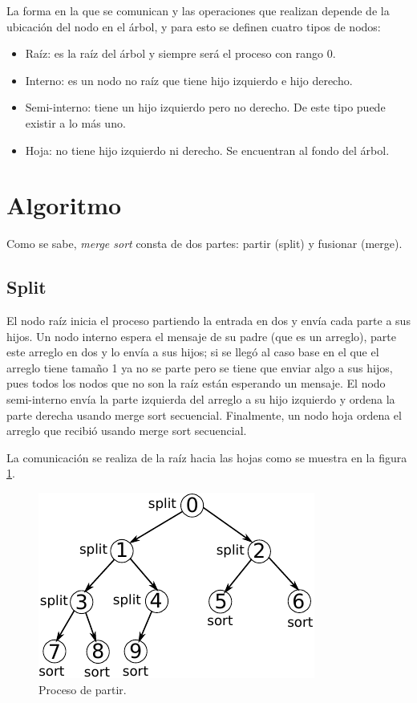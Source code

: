\documentclass{article}
\begin{document}
La forma en la que se comunican y las operaciones que realizan depende de la ubicación del nodo en el árbol, y para esto se definen cuatro tipos de nodos:

\begin{itemize}
\item Raíz: es la raíz del árbol y siempre será el proceso con rango 0.
\item Interno: es un nodo no raíz que tiene hijo izquierdo e hijo derecho.
\item Semi-interno: tiene un hijo izquierdo pero no derecho. De este tipo puede existir a lo más uno.
\item Hoja: no tiene hijo izquierdo ni derecho. Se encuentran al fondo del árbol.
\end{itemize}

\section{Algoritmo}

Como se sabe, \textit{merge sort} consta de dos partes: partir (split) y fusionar (merge). 

\subsection*{Split}

El nodo raíz inicia el proceso partiendo la entrada en dos y envía cada parte a sus hijos. Un nodo interno espera el mensaje de su padre (que es un arreglo), parte este arreglo en dos y lo envía a sus hijos; si se llegó al caso base en el que el arreglo tiene tamaño 1 ya no se parte pero se tiene que enviar algo a sus hijos, pues todos los nodos que no son la raíz están esperando un mensaje. El nodo semi-interno envía la parte izquierda del arreglo a su hijo izquierdo y ordena la parte derecha usando merge sort secuencial. Finalmente, un nodo hoja ordena el arreglo que recibió usando merge sort secuencial.

La comunicación se realiza de la raíz hacia las hojas como se muestra en la figura \ref{split}.

\begin{figure}[htbp]
\begin{center}
\includegraphics[scale=1]{red2}
\caption{Proceso de partir.}
\label{split}
\end{center}
\end{figure}
\end{document}
